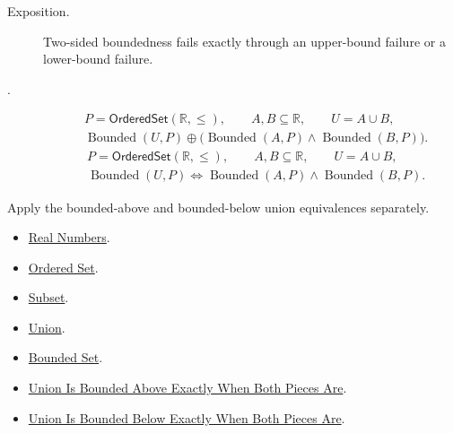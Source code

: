 \begin{remark*}
\begin{description}
\item[Exposition.]
Two-sided boundedness fails exactly through an upper-bound failure or a
lower-bound failure.


  \item[.]

\[
\begin{aligned}
&P=\mathsf{OrderedSet}(\mathbb{R},\leq),\qquad A,B\subseteq\mathbb{R},\qquad U=A\cup B,\\
&\operatorname{Bounded}(U,P)\oplus
\bigl(\operatorname{Bounded}(A,P)\land\operatorname{Bounded}(B,P)\bigr).
\end{aligned}
\]
\[
\begin{aligned}
&P=\mathsf{OrderedSet}(\mathbb{R},\leq),\qquad A,B\subseteq\mathbb{R},\qquad U=A\cup B,\\
&\operatorname{Bounded}(U,P)
\Longleftrightarrow
\operatorname{Bounded}(A,P)\land\operatorname{Bounded}(B,P).
\end{aligned}
\]
\end{description}
\end{remark*}

\begin{remark*}[Interpretation]
Apply the bounded-above and bounded-below union equivalences separately.
\end{remark*}

\begin{dependencies}
\begin{itemize}
\item \hyperref[def:reals]{Real Numbers}.
\item \hyperref[def:ordered-set]{Ordered Set}.
\item \hyperref[def:subset]{Subset}.
\item \hyperref[def:union]{Union}.
\item \hyperref[def:bounded]{Bounded Set}.
\item \hyperref[prop:union-bounded-above-iff-pieces-bounded-above]{Union Is Bounded Above Exactly When Both Pieces Are}.
\item \hyperref[prop:union-bounded-below-iff-pieces-bounded-below]{Union Is Bounded Below Exactly When Both Pieces Are}.
\end{itemize}
\end{dependencies}

